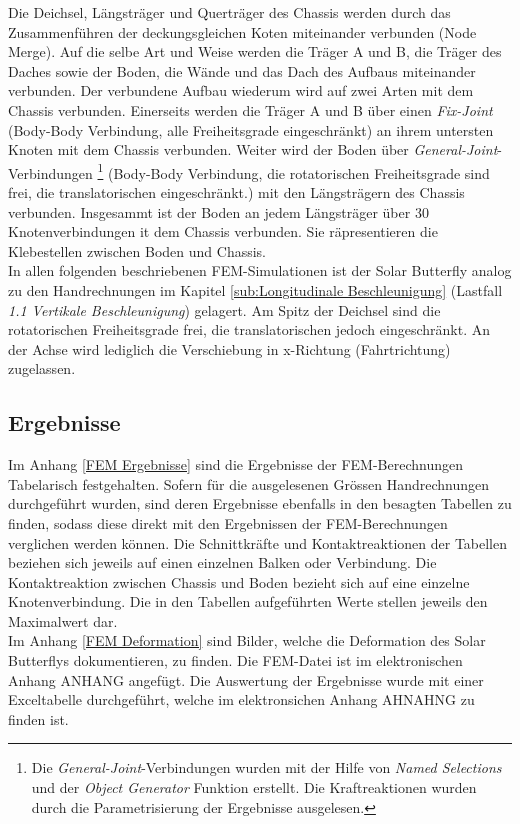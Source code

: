 Die Deichsel, Längsträger und Querträger des Chassis werden durch das Zusammenführen der deckungsgleichen Koten miteinander verbunden (Node Merge). Auf die selbe Art und Weise werden die Träger A und B, die Träger des Daches sowie der Boden, die Wände und das Dach des Aufbaus miteinander verbunden. Der verbundene Aufbau wiederum wird auf zwei Arten mit dem Chassis verbunden. Einerseits werden die Träger A und B über einen \emph{Fix-Joint} (Body-Body Verbindung, alle Freiheitsgrade eingeschränkt) an ihrem untersten Knoten mit dem Chassis verbunden. Weiter wird der Boden über \emph{General-Joint}-Verbindungen%
\footnote{Die \emph{General-Joint}-Verbindungen wurden mit der Hilfe von \emph{Named Selections} und der \emph{Object Generator} Funktion erstellt. Die Kraftreaktionen wurden durch die Parametrisierung der Ergebnisse ausgelesen.}
(Body-Body Verbindung, die rotatorischen Freiheitsgrade sind frei, die translatorischen eingeschränkt.) mit den Längsträgern des Chassis verbunden. Insgesammt ist der Boden an jedem Längsträger über 30 Knotenverbindungen it dem Chassis verbunden. Sie räpresentieren die Klebestellen zwischen Boden und Chassis.\\
In allen folgenden beschriebenen FEM-Simulationen ist der Solar Butterfly analog zu den Handrechnungen im Kapitel \ref{sub:Longitudinale Beschleunigung} (Lastfall \emph{1.1 Vertikale Beschleunigung}) gelagert. Am Spitz der Deichsel sind die rotatorischen Freiheitsgrade frei, die translatorischen jedoch eingeschränkt. An der Achse wird lediglich die Verschiebung in x-Richtung (Fahrtrichtung) zugelassen.

\subsection{Ergebnisse}
Im Anhang \ref{FEM Ergebnisse} sind die Ergebnisse der FEM-Berechnungen Tabelarisch festgehalten. Sofern für die ausgelesenen Grössen Handrechnungen durchgeführt wurden, sind deren Ergebnisse ebenfalls in den besagten Tabellen zu finden, sodass diese direkt mit den Ergebnissen der FEM-Berechnungen verglichen werden können. Die Schnittkräfte und Kontaktreaktionen der Tabellen beziehen sich jeweils auf einen einzelnen Balken oder Verbindung. Die Kontaktreaktion zwischen Chassis und Boden bezieht sich auf eine einzelne Knotenverbindung. Die in den Tabellen aufgeführten Werte stellen jeweils den Maximalwert dar.\\
Im Anhang \ref{FEM Deformation} sind Bilder, welche die Deformation des Solar Butterflys dokumentieren, zu finden. Die FEM-Datei ist im elektronischen Anhang ANHANG angefügt. Die Auswertung der Ergebnisse wurde mit einer Exceltabelle durchgeführt, welche im elektronsichen Anhang AHNAHNG zu finden ist.


